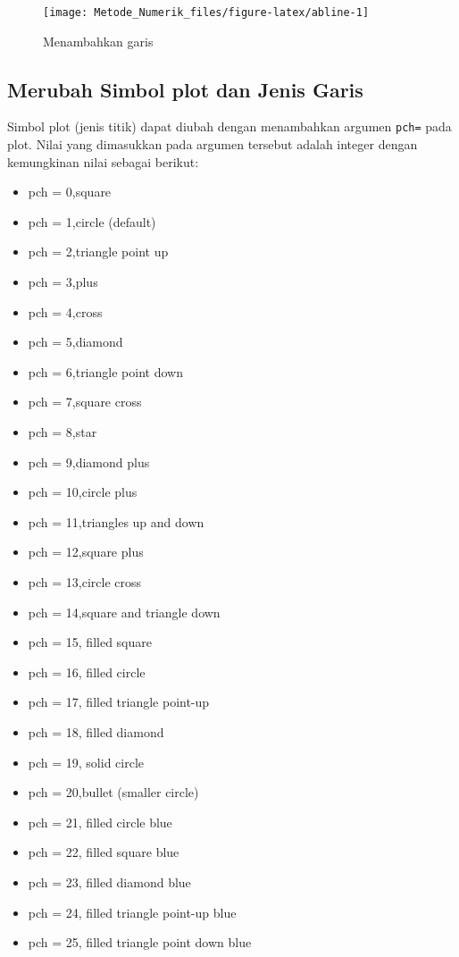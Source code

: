 \documentclass[]{book}
\providecommand{\tightlist}{%
  \setlength{\itemsep}{0pt}\setlength{\parskip}{0pt}}
\theoremstyle{definition}
\theoremstyle{definition}
\theoremstyle{definition}
\theoremstyle{remark}
\begin{document}
\begin{figure}

{\centering \texttt{[image: Metode\_Numerik\_files/figure-latex/abline-1]} 

}

\caption{Menambahkan garis}\label{fig:abline}
\end{figure}

\hypertarget{changepoint}{%
\subsection{Merubah Simbol plot dan Jenis Garis}\label{changepoint}}

Simbol plot (jenis titik) dapat diubah dengan menambahkan argumen \texttt{pch=} pada plot. Nilai yang dimasukkan pada argumen tersebut adalah integer dengan kemungkinan nilai sebagai berikut:

\begin{itemize}
\tightlist
\item
  pch = 0,square
\item
  pch = 1,circle (default)
\item
  pch = 2,triangle point up
\item
  pch = 3,plus
\item
  pch = 4,cross
\item
  pch = 5,diamond
\item
  pch = 6,triangle point down
\item
  pch = 7,square cross
\item
  pch = 8,star
\item
  pch = 9,diamond plus
\item
  pch = 10,circle plus
\item
  pch = 11,triangles up and down
\item
  pch = 12,square plus
\item
  pch = 13,circle cross
\item
  pch = 14,square and triangle down
\item
  pch = 15, filled square
\item
  pch = 16, filled circle
\item
  pch = 17, filled triangle point-up
\item
  pch = 18, filled diamond
\item
  pch = 19, solid circle
\item
  pch = 20,bullet (smaller circle)
\item
  pch = 21, filled circle blue
\item
  pch = 22, filled square blue
\item
  pch = 23, filled diamond blue
\item
  pch = 24, filled triangle point-up blue
\item
  pch = 25, filled triangle point down blue
\end{itemize}
\end{document}
